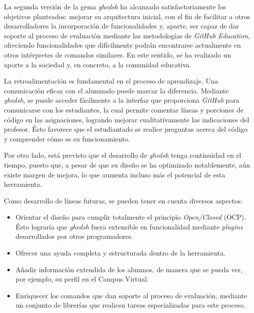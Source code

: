 

La segunda versión de la gema {\it ghedsh} ha alcanzado satisfactoriamente los objetivos planteados: mejorar su arquitectura inicial, con el fin de facilitar a otros desarrolladores
la incorporación de funcionalidades y, aparte, ser capaz de dar soporte al proceso de evaluación mediante las metodologías de {\it GitHub Education}, ofreciendo funcionalidades que difícilmente
podrán encontrarse actualmente en otros intérpretes de comandos similares. En este sentido, se ha realizado un aporte a la sociedad y, en concreto, a la comunidad educativa.
\bigskip

La retroalimentación es fundamental en el proceso de aprendizaje. Una comunicación eficaz con el alumnado puede marcar la diferencia. Mediante {\it ghedsh}, se puede acceder fácilmente a la interfaz que proporciona {\it GitHub} para comunicarse con los estudiantes, la cual permite comentar líneas y porciones de código en las asignaciones, logrando
mejorar cualitativamente las indicaciones del profesor. Ésto favorece que el estudiantado se realice preguntas acerca del código y comprender cómo es su funcionamiento.
\bigskip

Por otro lado, está previsto que el desarrollo de {\it ghedsh} tenga continuidad en el tiempo, puesto que, a pesar de que su diseño se ha optimizado notablemente, aún existe margen de mejora, lo que aumenta incluso más el potencial de esta herramienta.
\bigskip

Como desarrollo de líneas futuras, se pueden tener en cuenta diversos aspectos:
\begin{itemize}
	\item Orientar el diseño para cumplir totalmente el principio {\it Open/Closed} (OCP). Ésto lograría que {\it ghedsh} fuera extensible en funcionalidad mediante {\it plugins} desarrollados por otros programadores.
	\item Ofrecer una ayuda completa y estructurada dentro de la herramienta.
	\item Añadir información extendida de los alumnos, de manera que se pueda ver, por ejemplo, su perfil en el Campus Virtual.
	\item Enriquecer los comandos que dan soporte al proceso de evaluación, mediante un conjunto de librerías que realicen tareas especializadas para este proceso.
\end{itemize}



